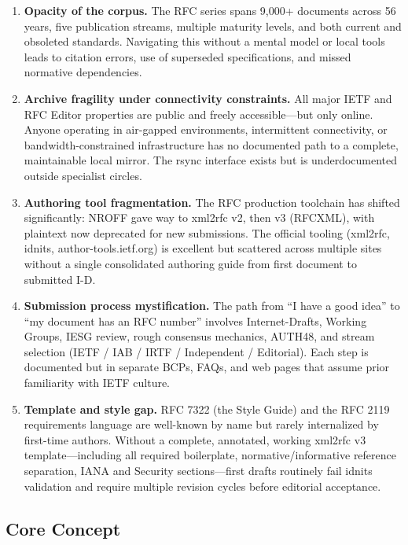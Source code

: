 \documentclass[11pt,letterpaper]{article}
\begin{document}
\begin{enumerate}
  \item \textbf{Opacity of the corpus.} The RFC series spans 9,000+ documents across 56 years, five publication streams, multiple maturity levels, and both current and obsoleted standards. Navigating this without a mental model or local tools leads to citation errors, use of superseded specifications, and missed normative dependencies.

  \item \textbf{Archive fragility under connectivity constraints.} All major IETF and RFC Editor properties are public and freely accessible---but only online. Anyone operating in air-gapped environments, intermittent connectivity, or bandwidth-constrained infrastructure has no documented path to a complete, maintainable local mirror. The rsync interface exists but is underdocumented outside specialist circles.

  \item \textbf{Authoring tool fragmentation.} The RFC production toolchain has shifted significantly: NROFF gave way to xml2rfc v2, then v3 (RFCXML), with plaintext now deprecated for new submissions. The official tooling (xml2rfc, idnits, author-tools.ietf.org) is excellent but scattered across multiple sites without a single consolidated authoring guide from first document to submitted I-D.

  \item \textbf{Submission process mystification.} The path from ``I have a good idea'' to ``my document has an RFC number'' involves Internet-Drafts, Working Groups, IESG review, rough consensus mechanics, AUTH48, and stream selection (IETF / IAB / IRTF / Independent / Editorial). Each step is documented but in separate BCPs, FAQs, and web pages that assume prior familiarity with IETF culture.

  \item \textbf{Template and style gap.} RFC 7322 (the Style Guide) and the RFC 2119 requirements language are well-known by name but rarely internalized by first-time authors. Without a complete, annotated, working xml2rfc v3 template---including all required boilerplate, normative/informative reference separation, IANA and Security sections---first drafts routinely fail idnits validation and require multiple revision cycles before editorial acceptance.
\end{enumerate}

\subsection{Core Concept}
\end{document}
